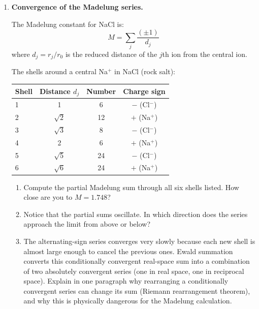 \documentclass[12pt, a4paper]{book}
\begin{document}
\begin{deepbox}
\begin{enumerate}[label=\textbf{D\arabic*.}]

  \item \textbf{Convergence of the Madelung series.}

    The Madelung constant for NaCl is:
    \[
      M = \sum_j \frac{(\pm 1)}{d_j}
    \]
    where $d_j = r_j/r_0$ is the reduced distance of the
    $j$th ion from the central ion.

    The shells around a central Na$^+$ in NaCl (rock salt):
    \begin{center}
    \small
    \begin{tabular}{lccc}
    \toprule
    Shell & Distance $d_j$ & Number & Charge sign \\
    \midrule
    1 & 1           & 6  & $-$ (Cl$^-$) \\
    2 & $\sqrt{2}$  & 12 & $+$ (Na$^+$) \\
    3 & $\sqrt{3}$  & 8  & $-$ (Cl$^-$) \\
    4 & 2           & 6  & $+$ (Na$^+$) \\
    5 & $\sqrt{5}$  & 24 & $-$ (Cl$^-$) \\
    6 & $\sqrt{6}$  & 24 & $+$ (Na$^+$) \\
    \bottomrule
    \end{tabular}
    \end{center}
    \begin{enumerate}[label=(\alph*)]
      \item Compute the partial Madelung sum through
            all six shells listed.
            How close are you to $M = 1.748$?
      \item Notice that the partial sums oscillate.
            In which direction does the series approach
            the limit from above or below?
      \item The alternating-sign series converges very slowly
            because each new shell is almost large enough
            to cancel the previous ones.
            Ewald summation converts this conditionally
            convergent real-space sum into a combination
            of two absolutely convergent series
            (one in real space, one in reciprocal space).
            Explain in one paragraph why rearranging
            a conditionally convergent series can change
            its sum (Riemann rearrangement theorem),
            and why this is physically dangerous for
            the Madelung calculation.
    \end{enumerate}


\end{enumerate}
\end{deepbox}
\end{document}
